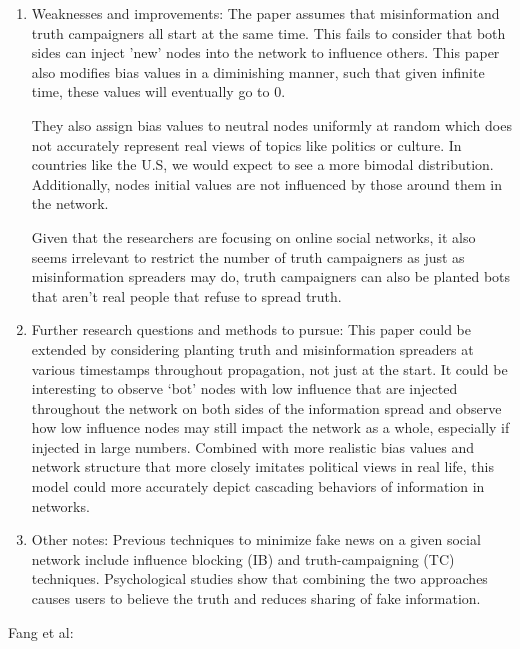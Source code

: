 \documentclass[11pt]{article}
\begin{document}
\begin{enumerate}
    \item Weaknesses and improvements: The paper assumes that misinformation and truth campaigners all start at the same time. This fails to consider that both sides can inject 'new' nodes into the network to influence others. This paper also modifies bias values in a diminishing manner, such that given infinite time, these values will eventually go to 0.

    They also assign bias values to neutral nodes uniformly at random which does not accurately represent real views of topics like politics or culture. In countries like the U.S, we would expect to see a more bimodal distribution. Additionally, nodes initial values are not influenced by those around them in the network.

    Given that the researchers are focusing on online social networks, it also seems irrelevant to restrict the number of truth campaigners as just as misinformation spreaders may do, truth campaigners can also be planted bots that aren't real people that refuse to spread truth.

    \item Further research questions and methods to pursue: This paper could be extended by considering planting truth and misinformation spreaders at various timestamps throughout propagation, not just at the start. It could be interesting to observe `bot' nodes with low influence that are injected throughout the network on both sides of the information spread and observe how low influence nodes may still impact the network as a whole, especially if injected in large numbers. Combined with more realistic bias values and network structure that more closely imitates political views in real life, this model could more accurately depict cascading behaviors of information in networks.

    \item Other notes: Previous techniques to minimize fake news on a given social network include influence blocking (IB) and truth-campaigning (TC) techniques. Psychological studies show that combining the two approaches causes users to believe the truth and reduces sharing of fake information.
\end{enumerate}

Fang et al:
\end{document}
